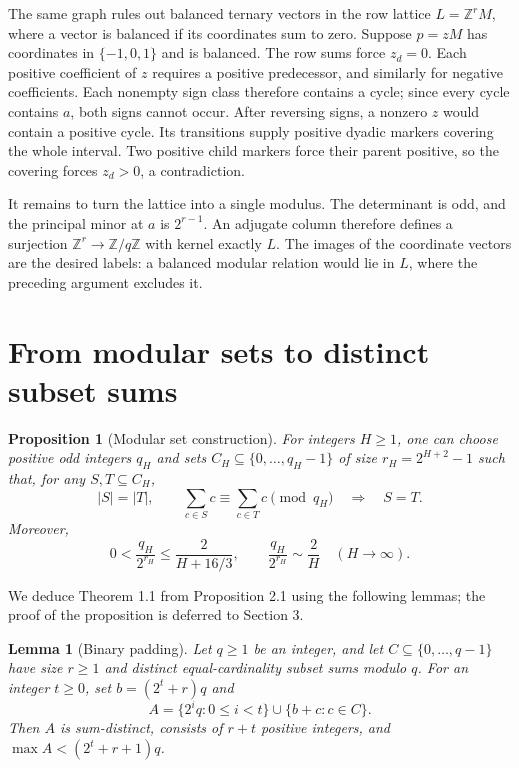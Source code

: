 \documentclass[reqno]{amsart}
\newtheorem{proposition}[theorem]{Proposition}
\newtheorem{lemma}[theorem]{Lemma}
\theoremstyle{remark}
\numberwithin{equation}{section}
\newcommand{\Z}{\mathbb{Z}}
\begin{document}
The same graph rules out balanced ternary vectors in the row lattice $L=\Z^rM$, where a vector
is balanced if its coordinates sum to zero.  Suppose $p=zM$ has coordinates in $\{-1,0,1\}$
and is balanced.  The row sums force $z_d=0$.  Each positive coefficient of $z$ requires a
positive predecessor, and similarly for negative coefficients.  Each nonempty sign class
therefore contains a cycle; since every cycle contains $a$, both signs cannot occur.  After
reversing signs, a nonzero $z$ would contain a positive cycle.  Its transitions supply positive
dyadic markers covering the whole interval.  Two positive child markers force their parent
positive, so the covering forces $z_d>0$, a contradiction.

It remains to turn the lattice into a single modulus.  The determinant is odd, and the principal
minor at $a$ is $2^{r-1}$.  An adjugate column therefore defines a surjection $\Z^r\to\Z/q\Z$
with kernel exactly $L$.  The images of the coordinate vectors are the desired labels: a balanced
modular relation would lie in $L$, where the preceding argument excludes it.

\section{From modular sets to distinct subset sums}

\begin{proposition}[Modular set construction]
For integers $H\geq 1$, one can choose positive odd integers $q_H$ and sets
$C_H\subseteq\{0,\ldots,q_H-1\}$ of size $r_H=2^{H+2}-1$ such that, for any
$S,T\subseteq C_H$,
\[
|S|=|T|,\qquad
\sum_{c\in S}c\equiv\sum_{c\in T}c\pmod{q_H}
\quad\Longrightarrow\quad S=T.
\]
Moreover,
\[
0<\frac{q_H}{2^{r_H}}\leq\frac{2}{H+16/3},
\qquad
\frac{q_H}{2^{r_H}}\sim\frac{2}{H}\quad(H\to\infty).
\]
\end{proposition}

We deduce Theorem 1.1 from Proposition 2.1 using the following lemmas; the proof of the
proposition is deferred to Section 3.

\begin{lemma}[Binary padding]
Let $q\geq 1$ be an integer, and let $C\subseteq\{0,\ldots,q-1\}$ have size $r\geq 1$ and
distinct equal-cardinality subset sums modulo $q$.  For an integer $t\geq 0$, set
$b=(2^t+r)q$ and
\[
A=\{2^iq:0\leq i<t\}\cup\{b+c:c\in C\}.
\]
Then $A$ is sum-distinct, consists of $r+t$ positive integers, and
$\max A<(2^t+r+1)q$.
\end{lemma}
\end{document}

